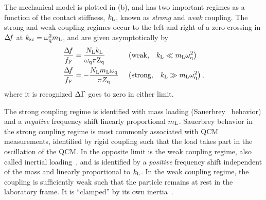 The mechanical model is plotted in (b), and has
two important regimes as a function of the contact stiffness, $k_\mathrm{L}$, known
as \textit{strong} and \textit{weak} coupling.  The strong and weak
coupling regimes occur to the left and right of a zero crossing in $\Delta\!f$ at
$k_\mathrm{zc}=\omega_\mathrm{q}^2 m_\mathrm{L}$, and are given asymptotically by
\begin{align}
\frac{\Delta\!f}{f_\mathrm{F}}&=
\frac{N_\mathrm{L} k_\mathrm{L}}
{\omega_\mathrm{q}\pi \mathrm{Z}_\mathrm{q}}
&\,&\left(\text{weak,}\quad k_\mathrm{L}\ll m_\mathrm{L}
\omega_\mathrm{q}^2\right)
\label{eqn:couplinguy1}
\\
\frac{\Delta\!f}{f_\mathrm{F}}&=  -\frac{N_\mathrm{L}
m_\mathrm{L} \omega_\mathrm{q}}{\pi Z_\mathrm{q}}
&\,&\left(\text{strong,}\quad k_\mathrm{L}\gg m_\mathrm{L}
\omega_\mathrm{q}^2\right),
\label{eqn:couplinguy2}
\end{align}
where it is recognized $\Delta\Gamma$ goes to zero in either limit.

The strong coupling regime is identified with mass loading
(Sauerbrey~\cite{sauerbrey1959verwendung} behavior) and a \textit{negative}
frequency shift linearly proportional $m_\mathrm{L}$.  Sauerbrey behavior in the
strong coupling regime is most commonly associated with QCM measurements,
identified by rigid coupling such that the load takes part in the
oscillation of the QCM.  In the opposite limit is the weak coupling regime,
also called inertial loading~\cite{dybwad1985sensitive}, and is identified
by a \textit{positive} frequency shift independent of the mass and linearly
proportional to $k_\mathrm{L}$.  In the weak coupling regime, the coupling is
sufficiently weak such that the particle remains at rest in the laboratory
frame.  It is ``clamped'' by its own inertia~\cite{du2008role}.


